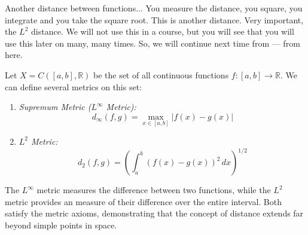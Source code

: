 \begin{spoken-clean}[00:19:15 - 00:21:15]
Another distance between functions...  You measure the distance, you square, you integrate and you take the square root. This is another distance. Very important, the $L^2$ distance. We will not use this in a course, but you will see that you will use this later on many, many times. So, we will continue next time from --- from here.
\end{spoken-clean}

\begin{math-stroke}
Let $X = C([a, b], \mathbb{R})$ be the set of all continuous functions $f: [a, b] \to \mathbb{R}$. We can define several metrics on this set:
\begin{enumerate}
    \setcounter{enumi}{0} \item \emph{Supremum Metric (\texorpdfstring{$L^\infty$}{L-infinity} Metric):}
    \[ d_\infty(f, g) = \max_{x \in [a, b]} |f(x) - g(x)| \]
    \setcounter{enumi}{1} \item \emph{\texorpdfstring{$L^2$}{L2} Metric:}
    \[ d_2(f, g) = \left( \int_a^b (f(x) - g(x))^2 \, dx \right)^{1/2} \]
\end{enumerate}

\begin{center}
\end{center}

\begin{explanation-of-steps}
The $L^\infty$ metric measures the  difference between two functions, while the $L^2$ metric provides an  measure of their difference over the entire interval. Both satisfy the metric axioms, demonstrating that the concept of distance extends far beyond simple points in space.
\end{explanation-of-steps}
\end{math-stroke}
